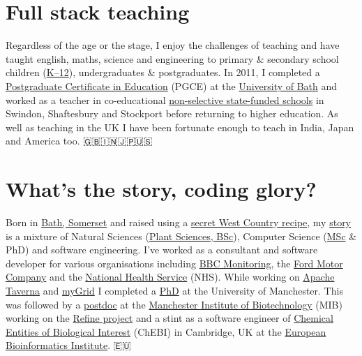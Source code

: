 \documentclass[
  12pt,
]{book}
\begin{document}
\hypertarget{full-stack-teaching}{%
\section*{Full stack teaching}\label{full-stack-teaching}}

Regardless of the age or the stage, I enjoy the challenges of teaching and have taught english, maths, science and engineering to primary \& secondary school children (\href{https://en.wikipedia.org/wiki/K\%E2\%80\%9312}{K--12}), undergraduates \& postgraduates. In 2011, I completed a \href{https://en.wikipedia.org/wiki/Postgraduate_Certificate_in_Education}{Postgraduate Certificate in Education} (PGCE) at the \href{https://www.bath.ac.uk/}{University of Bath} and worked as a teacher in co-educational \href{https://en.wikipedia.org/wiki/State-funded_schools_(England)}{non-selective state-funded schools} in Swindon, Shaftesbury and Stockport before returning to higher education. As well as teaching in the UK I have been fortunate enough to teach in India, Japan and America too. 🇬🇧🇮🇳🇯🇵🇺🇸

\hypertarget{whats-the-story-coding-glory}{%
\section*{What's the story, coding glory?}\label{whats-the-story-coding-glory}}

Born in \href{https://en.wikipedia.org/wiki/Bath,_Somerset}{Bath, Somerset} and raised using a \href{https://en.wikipedia.org/wiki/West_Country}{secret West Country recipe}, my \href{https://uk.linkedin.com/in/duncanhull}{story} is a mixture of Natural Sciences (\href{http://www.plantsciences.manchester.ac.uk/}{Plant Sciences, BSc}), Computer Science (\href{http://www.cs.man.ac.uk/~hulld/msc2003.html}{MSc} \& PhD) and software engineering. I've worked as a consultant and software developer for various organisations including \href{https://en.wikipedia.org/wiki/BBC_Monitoring}{BBC Monitoring}, the \href{https://en.wikipedia.org/wiki/Ford_Motor_Company}{Ford Motor Company} and the \href{https://en.wikipedia.org/wiki/National_Health_Service}{National Health Service} (NHS). While working on \href{https://en.wikipedia.org/wiki/Apache_Taverna}{Apache Taverna} and \href{https://en.wikipedia.org/wiki/MyGrid}{myGrid} I completed a \href{https://ethos.bl.uk/OrderDetails.do?uin=uk.bl.ethos.497578}{PhD} at the University of Manchester. This was followed by a \href{https://en.wikipedia.org/wiki/Postdoctoral_researcher}{postdoc} at the \href{http://www.mib.ac.uk/}{Manchester Institute of Biotechnology} (MIB) working on the \href{http://www.nactem.ac.uk/pathtext/}{Refine project} and a stint as a software engineer of \href{https://www.ebi.ac.uk/chebi/}{Chemical Entities of Biological Interest} (ChEBI) in Cambridge, UK at the \href{https://en.wikipedia.org/wiki/European_Bioinformatics_Institute}{European Bioinformatics Institute}. 🇪🇺
\end{document}
